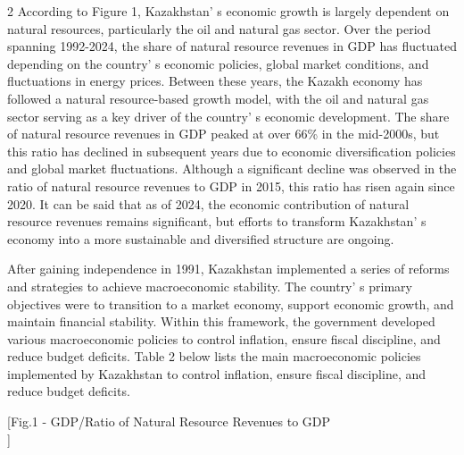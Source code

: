 \begin{multicols}{2}
According to Figure 1, Kazakhstan' s economic growth is
largely dependent on natural resources, particularly the oil and natural
gas sector. Over the period spanning 1992-2024, the share of natural
resource revenues in GDP has fluctuated depending on the
country' s economic policies, global market conditions,
and fluctuations in energy prices. Between these years, the Kazakh
economy has followed a natural resource-based growth model, with the oil
and natural gas sector serving as a key driver of the
country' s economic development. The share of natural
resource revenues in GDP peaked at over 66\% in the mid-2000s, but this
ratio has declined in subsequent years due to economic diversification
policies and global market fluctuations. Although a significant decline
was observed in the ratio of natural resource revenues to GDP in 2015,
this ratio has risen again since 2020. It can be said that as of 2024,
the economic contribution of natural resource revenues remains
significant, but efforts to transform Kazakhstan' s
economy into a more sustainable and diversified structure are ongoing.

After gaining independence in 1991, Kazakhstan implemented a series of
reforms and strategies to achieve macroeconomic stability. The
country' s primary objectives were to transition to a
market economy, support economic growth, and maintain financial
stability. Within this framework, the government developed various
macroeconomic policies to control inflation, ensure fiscal discipline,
and reduce budget deficits. Table 2 below lists the main macroeconomic
policies implemented by Kazakhstan to control inflation, ensure fiscal
discipline, and reduce budget deficits.
\end{multicols}

[Fig.1 - GDP/Ratio of Natural Resource Revenues to
GDP\\]

